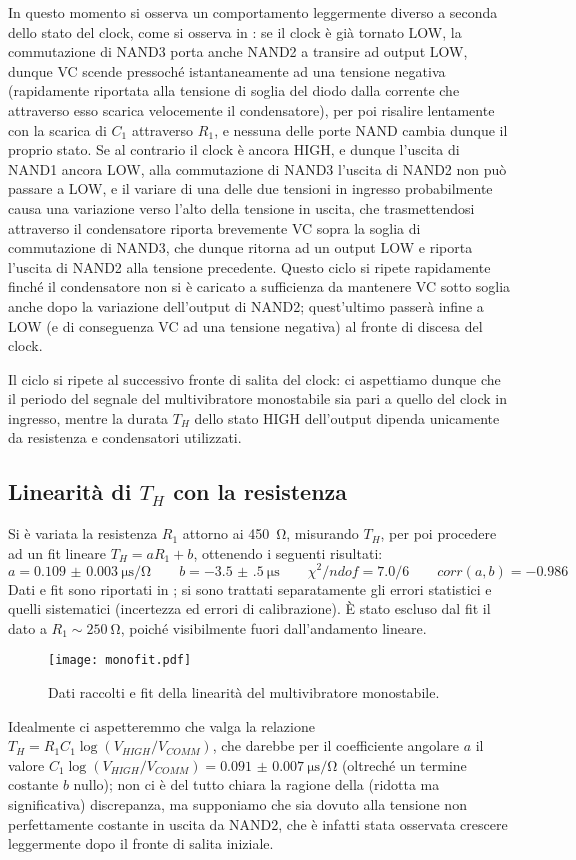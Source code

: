 In questo momento si osserva un comportamento leggermente diverso a seconda
dello stato del clock, come si osserva in : se il clock è già tornato LOW, la commutazione di NAND3
porta anche NAND2 a transire ad output LOW, dunque VC scende pressoché
istantaneamente ad una tensione negativa (rapidamente riportata alla tensione
di soglia del diodo dalla corrente che attraverso esso scarica velocemente il
condensatore), per poi risalire lentamente con la scarica di $C_1$ attraverso
$R_1$, e nessuna delle porte NAND cambia dunque il proprio stato.
Se al contrario il clock è ancora HIGH, e dunque l'uscita di NAND1 ancora LOW,
alla commutazione di NAND3 l'uscita di NAND2 non può passare a LOW, e il variare
di una delle due tensioni in ingresso probabilmente causa una variazione verso
l'alto della tensione in uscita, che trasmettendosi
attraverso il condensatore riporta brevemente VC sopra la soglia di
commutazione di NAND3, che dunque ritorna ad un output LOW e riporta l'uscita
di NAND2 alla tensione precedente. Questo ciclo si ripete rapidamente finché
il condensatore non si è caricato a sufficienza da mantenere VC sotto soglia
anche dopo la variazione dell'output di NAND2; quest'ultimo passerà infine a
LOW (e di conseguenza VC ad una tensione negativa) al fronte di discesa del
clock.

Il ciclo si ripete al successivo fronte di salita del clock: ci aspettiamo
dunque che il periodo del segnale del multivibratore monostabile sia pari a
quello del clock in ingresso, mentre la durata $T_H$ dello stato HIGH
dell'output dipenda unicamente da resistenza e condensatori utilizzati.

\subsection{Linearità di $T_H$ con la resistenza}

Si è variata la resistenza $R_1$ attorno ai \SI{450}{\ohm}, misurando $T_H$, per
poi procedere ad un fit lineare $T_H = a R_1 + b$, ottenendo i seguenti risultati:
$$a = \SI{0.109(3)}{\micro\second \per \ohm} \qquad b=\SI{-3.5(5)}{\micro \second} \qquad \chi^2/ndof = 7.0/6 \qquad corr(a,b)= -0.986$$
Dati e fit sono riportati in ; si sono trattati separatamente gli
errori statistici e quelli sistematici (incertezza ed errori di calibrazione).
È stato escluso dal fit il dato a $R_1 \sim \SI{250}{\ohm}$, poiché
visibilmente fuori dall'andamento lineare.

\begin{figure}[h]
	\centering
	\texttt{[image: monofit.pdf]}
	\caption{Dati raccolti e fit della linearità del multivibratore monostabile.}
	\label{monofit}
\end{figure}

Idealmente ci aspetteremmo che valga la relazione
$ T_H = R_1 C_1 \log (V_{HIGH}/V_{COMM}) $,
che darebbe per il coefficiente angolare $a$ il valore
$ C_1 \log (V_{HIGH}/V_{COMM}) = \SI{0.091(7)}{\us\per\ohm}$ (oltreché
un termine costante $b$ nullo); non ci è del tutto
chiara la ragione della (ridotta ma significativa) discrepanza, ma supponiamo
che sia dovuto alla tensione non perfettamente costante in uscita da NAND2, che
è infatti stata osservata crescere leggermente dopo il fronte di
salita iniziale.
